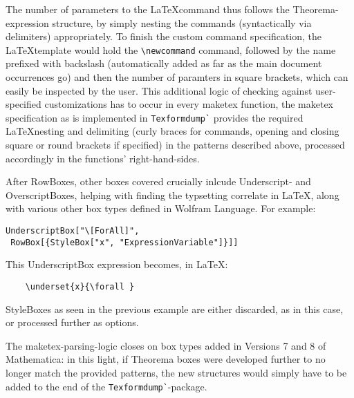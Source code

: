 The number of parameters to the \LaTeX command thus follows the Theorema-expression structure, by simply nesting the commands (syntactically via delimiters) appropriately. To finish the custom command specification, the \LaTeX template would hold the \lstinline+\newcommand+ command, followed by the name prefixed with backslash (automatically added as far as the main document occurrences go) and then the number of paramters in square brackets, which can easily be inspected by the user. This additional logic of checking against user-specified customizations has to occur in every maketex function, the maketex specification as is implemented in \lstinline+Texformdump`+ provides the required \LaTeX nesting and delimiting (curly braces for commands, opening and closing square or round brackets if specified) in the patterns described above, processed accordingly in the functions' right-hand-sides.

After RowBoxes, other boxes covered crucially inlcude Underscript- and OverscriptBoxes, helping with finding the typsetting correlate in \LaTeX, along with various other box types defined in Wolfram Language. For example:

\begin{verbatim}
UnderscriptBox["\[ForAll]", 
 RowBox[{StyleBox["x", "ExpressionVariable"]}]]
\end{verbatim}

This UnderscriptBox expression becomes, in \LaTeX:

\begin{verbatim}
    \underset{x}{\forall }
\end{verbatim}

StyleBoxes as seen in the previous example are either discarded, as in this case, or processed further as options.

The maketex-parsing-logic closes on box types added in Versions 7 and 8 of Mathematica: in this light, if Theorema boxes were developed further to no longer match the provided patterns, the new structures would simply have to be added to the end of the \lstinline+Texformdump`+-package.